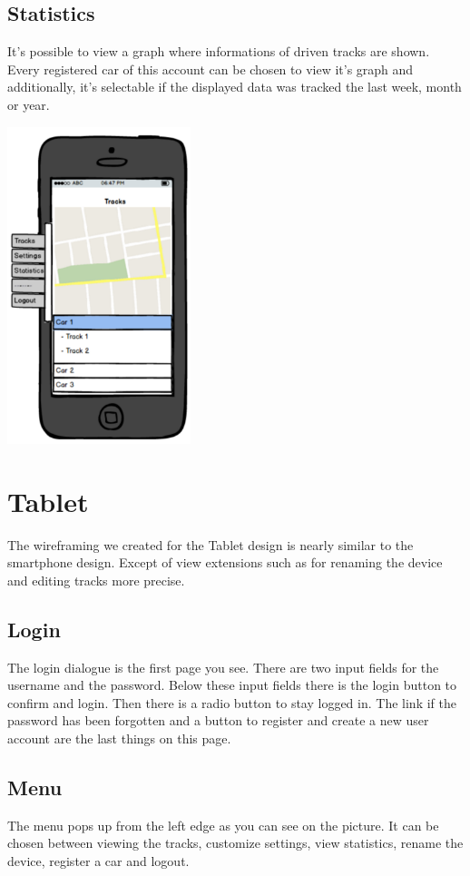 \subsection{Statistics}
It’s possible to view a graph where informations of driven tracks are shown. Every registered car of this account can be chosen to view it’s graph and additionally, it’s selectable if the displayed data was tracked the last week, month or year.
\begin{center}
\includegraphics[width=0.4\textwidth]{bilder/Smartphone}
\end{center}
\section{Tablet}
The wireframing we created for the Tablet design is nearly similar to the smartphone design. Except of view extensions such as for renaming the device and editing tracks more precise.
\subsection{Login}
The login dialogue is the first page you see. There are two input fields for the username and the password. Below these input fields there is the login button to confirm and login. Then there is a radio button to stay logged in.
The link if the password has been forgotten and a button to register and create a new user account are the last things on this page.
\subsection{Menu}
The menu pops up from the left edge as you can see on the picture. It can be chosen between viewing the tracks, customize settings, view statistics, rename the device, register a car and logout.
